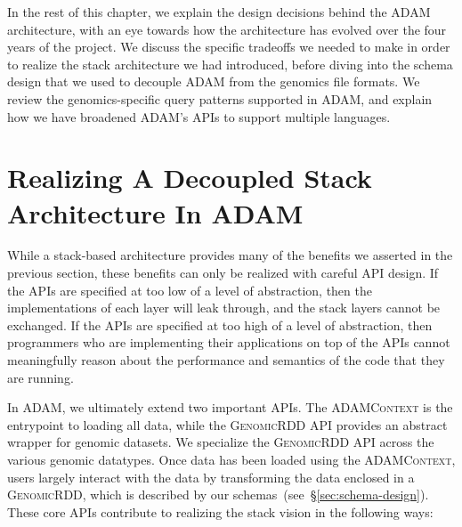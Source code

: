 \documentclass[phd]{ucbthesis}
\begin{document}
In the rest of this chapter, we explain the design decisions behind the
\textsc{ADAM} architecture, with an eye towards how the architecture has
evolved over the four years of the project. We discuss the specific tradeoffs
we needed to make in order to realize the stack architecture we had introduced,
before diving into the schema design that we used to decouple \textsc{ADAM} from
the genomics file formats. We review the genomics-specific query patterns
supported in \textsc{ADAM}, and explain how we have broadened \textsc{ADAM}'s
APIs to support multiple languages.

\section{Realizing A Decoupled Stack Architecture In \textsc{ADAM}}
\label{sec:realizing-stack-architecture}

While a stack-based architecture provides many of the benefits we asserted in
the previous section, these benefits can only be realized with careful API
design. If the APIs are specified at too low of a level of abstraction, then the
implementations of each layer will leak through, and the stack layers cannot be
exchanged. If the APIs are specified at too high of a level of abstraction, then
programmers who are implementing their applications on top of the APIs cannot
meaningfully reason about the performance and semantics of the code that they
are running.

In \textsc{ADAM}, we ultimately extend two important APIs. The
\textsc{ADAMContext} is the entrypoint to loading all data, while the
\textsc{GenomicRDD} API provides an abstract wrapper for genomic datasets. We
specialize the \textsc{GenomicRDD} API across the various genomic datatypes.
Once data has been loaded using the \textsc{ADAMContext}, users largely interact
with the data by transforming the data enclosed in a \textsc{GenomicRDD}, which
is described by our schemas~(see~\S\ref{sec:schema-design}). These core APIs
contribute to realizing the stack vision in the following ways:
\end{document}
